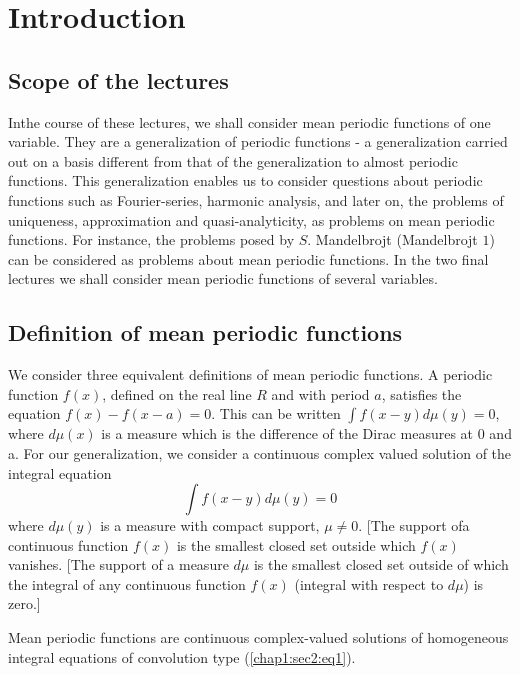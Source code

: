 \chapter{Introduction}\label{chap1}

\section{Scope of the lectures}\label{chap1:sec1}%

In\pageoriginale the course of these lectures, we shall consider mean periodic
functions of one variable. They are a generalization of periodic
functions - a generalization carried out on a basis different from
that of the generalization to almost periodic functions. This
generalization enables us to consider questions about periodic
functions such as Fourier-series, harmonic analysis, and later on, the
problems of uniqueness, approximation and quasi-analyticity, as
problems on mean periodic functions. For instance, the problems posed
by $S$. Mandelbrojt (Mandelbrojt $1$) can be considered as problems
about mean periodic functions. In the two final lectures we shall
consider mean periodic functions of several variables. 

\section{Definition of mean periodic functions}\label{chap1:sec2} %

We consider three equivalent definitions of mean periodic functions. A
periodic function $f(x)$, defined on the real line $R$ and with period
${a}$, satisfies the equation $f(x) - f(x - a)=0$. This can
be written $\int f(x - y) d \mu(y) = 0$, where $d \mu (x)$ is a
measure which is the difference of the Dirac measures at $0$ and
a. For our generalization, we consider a continuous complex valued
solution of the integral equation 
\begin{equation*}
 \int f(x - y) d \mu (y) = 0 \tag{1}\label{chap1:sec2:eq1}
\end{equation*}
where $d\mu (y)$ is a measure with compact support, $\mu \neq 0$. [The
 support of\pageoriginale a continuous function $f(x)$ is the smallest closed set
 outside which $f(x)$ vanishes. [The support of a measure $d \mu$ is
 the smallest closed set outside of which the integral of any
 continuous function $f(x)$ (integral with respect to $d \mu$) is
 zero.] 

\begin{defi}\label{chap1:sec2:def1}%
 Mean periodic functions are continuous complex-valued solutions
 of homogeneous integral equations of convolution type (\ref{chap1:sec2:eq1}). 
\end{defi}

